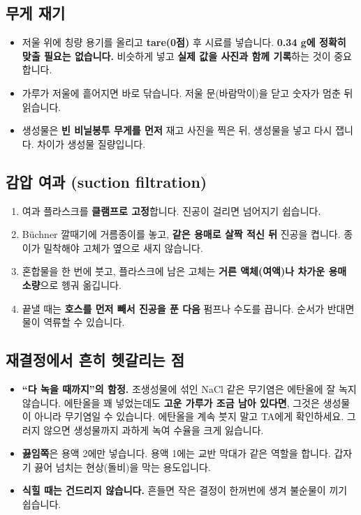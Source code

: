 \documentclass[10pt,a4paper]{article}
\begin{document}
\subsection*{무게 재기}
\begin{itemize}[leftmargin=5mm,itemsep=0.5mm]
\item 저울 위에 칭량 용기를 올리고 \textbf{tare(0점)} 후 시료를 넣습니다. \textbf{0.34 g에 정확히 맞출 필요는 없습니다.} 비슷하게 넣고 \textbf{실제 값을 사진과 함께 기록}하는 것이 중요합니다.
\item 가루가 저울에 흩어지면 바로 닦습니다. 저울 문(바람막이)을 닫고 숫자가 멈춘 뒤 읽습니다.
\item 생성물은 \textbf{빈 비닐봉투 무게를 먼저} 재고 사진을 찍은 뒤, 생성물을 넣고 다시 잽니다. 차이가 생성물 질량입니다.
\end{itemize}

\subsection*{감압 여과 (suction filtration)}
\begin{enumerate}[leftmargin=6mm,itemsep=0.5mm]
\item 여과 플라스크를 \textbf{클램프로 고정}합니다. 진공이 걸리면 넘어지기 쉽습니다.
\item Büchner 깔때기에 거름종이를 놓고, \textbf{같은 용매로 살짝 적신 뒤} 진공을 켭니다. 종이가 밀착해야 고체가 옆으로 새지 않습니다.
\item 혼합물을 한 번에 붓고, 플라스크에 남은 고체는 \textbf{거른 액체(여액)나 차가운 용매 소량}으로 헹궈 옮깁니다.
\item 끝낼 때는 \textbf{호스를 먼저 빼서 진공을 푼 다음} 펌프나 수도를 끕니다. 순서가 반대면 물이 역류할 수 있습니다.
\end{enumerate}

\subsection*{재결정에서 흔히 헷갈리는 점}
\begin{itemize}[leftmargin=5mm,itemsep=0.5mm]
\item \textbf{``다 녹을 때까지''의 함정.} 조생성물에 섞인 NaCl 같은 무기염은 에탄올에 잘 녹지 않습니다. 에탄올을 꽤 넣었는데도 \textbf{고운 가루가 조금 남아 있다면}, 그것은 생성물이 아니라 무기염일 수 있습니다. 에탄올을 계속 붓지 말고 TA에게 확인하세요. 그러지 않으면 생성물까지 과하게 녹여 수율을 크게 잃습니다.
\item \textbf{끓임쪽}은 용액 2에만 넣습니다. 용액 1에는 교반 막대가 같은 역할을 합니다. 갑자기 끓어 넘치는 현상(돌비)을 막는 용도입니다.
\item \textbf{식힐 때는 건드리지 않습니다.} 흔들면 작은 결정이 한꺼번에 생겨 불순물이 끼기 쉽습니다.
\end{itemize}
\end{document}

